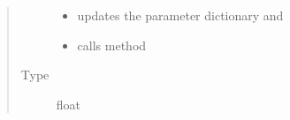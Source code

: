 \documentclass[a4paper,10pt,english]{sphinxmanual}
\begin{document}
\begin{fulllineitems}
\begin{fulllineitems}
\begin{quote}
\begin{description}
\begin{itemize}
\item {} 
updates the parameter dictionary  and

\item {} 
calls method 

\end{itemize}

\item[{Type}] \leavevmode
float

\end{description}\end{quote}

\end{fulllineitems}


\end{fulllineitems}

\end{document}
